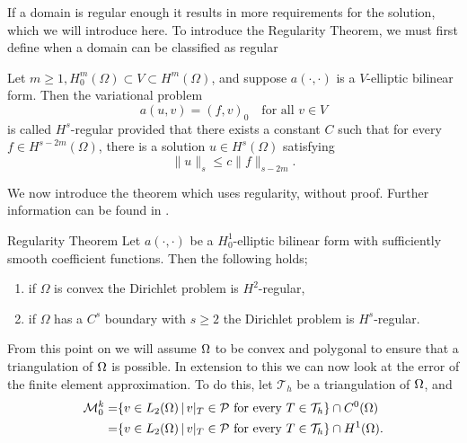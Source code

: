 If a domain is regular enough it results in more requirements for the solution, which 
we will introduce here.
To introduce the Regularity Theorem, we must first define when a domain can be classified as regular

\begin{defn}{\quad\label{defn:7.1}}
    Let $m\geq 1, H^m_0(\Omega)\subset V\subset H^m(\Omega)$, and suppose $a(\cdot,\cdot)$ is a $V$-elliptic bilinear form. 
    Then the variational problem
    \begin{equation}
        a(u,v) = {(f,v)}_0\quad \text{for all } v\in V
    \end{equation}
    is called $H^s$-regular provided that there exists a constant $C$ such that for every  $f\in H^{s-2m}(\Omega)$,
    there is a solution $u\in H^s(\Omega)$ satisfying
    \begin{equation}
        \|u\|_s\leq c\|f\|_{s-2m}.
    \end{equation}
\end{defn}
We now introduce the theorem which uses regularity, without proof. Further information can be found in \cite{Braess}.
\begin{thmx}{Regularity Theorem}
    Let $a(\cdot,\cdot)$ be a $H^1_0$-elliptic bilinear form with sufficiently smooth coefficient functions. Then the following holds; 
    \begin{enumerate}
        \item if $\Omega$ is convex the Dirichlet problem is $H^2$-regular, 
        \item if $\Omega$ has a $C^s$ boundary with $s\geq 2$ the Dirichlet problem is $H^s$-regular.
    \end{enumerate}
\end{thmx}


From this point on we will assume $\Omega$ to be convex and polygonal to ensure that a triangulation of $\Omega$ is possible. 
In extension to this we can now look at the error of the finite element approximation.
To do this, let $\mathcal{T}_h$ be a triangulation of $\Omega$, and
\begin{align*}
    \mathcal{M}^k_0 =& \{ v \in L_2(\Omega) \,|\, v|_T \in \mathcal{P} \text{ for every } T \in \mathcal{T}_h \} \cap C^0(\Omega) \\
    =& \{ v \in L_2(\Omega) \,|\, v|_T \in \mathcal{P} \text{ for every } T \in \mathcal{T}_h \} \cap H^1(\Omega) .
\end{align*}

